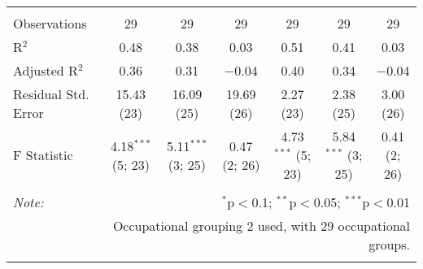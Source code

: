 \begin{sidewaystable}[!htbp]
\begin{tabular}{@{\extracolsep{0pt}}lcccccc}
  & & & & & & \\ 
\hline \\[-1.8ex] 
Observations & 29 & 29 & 29 & 29 & 29 & 29 \\ 
R$^{2}$ & 0.48 & 0.38 & 0.03 & 0.51 & 0.41 & 0.03 \\ 
Adjusted R$^{2}$ & 0.36 & 0.31 & $-$0.04 & 0.40 & 0.34 & $-$0.04 \\ 
Residual Std. Error & 15.43 (23) & 16.09 (25) & 19.69 (26) & 2.27 (23) & 2.38 (25) & 3.00 (26) \\ 
F Statistic & 4.18$^{***}$ (5; 23) & 5.11$^{***}$ (3; 25) & 0.47 (2; 26) & 4.73$^{***}$ (5; 23) & 5.84$^{***}$ (3; 25) & 0.41 (2; 26) \\ 
\hline 
\hline \\[-1.8ex] 
\textit{Note:}  & \multicolumn{6}{r}{$^{*}$p$<$0.1; $^{**}$p$<$0.05; $^{***}$p$<$0.01} \\ 
 & \multicolumn{6}{r}{Occupational grouping 2 used, with 29 occupational groups.} \\ 
\normalsize 
\end{tabular} 
\end{sidewaystable} 

